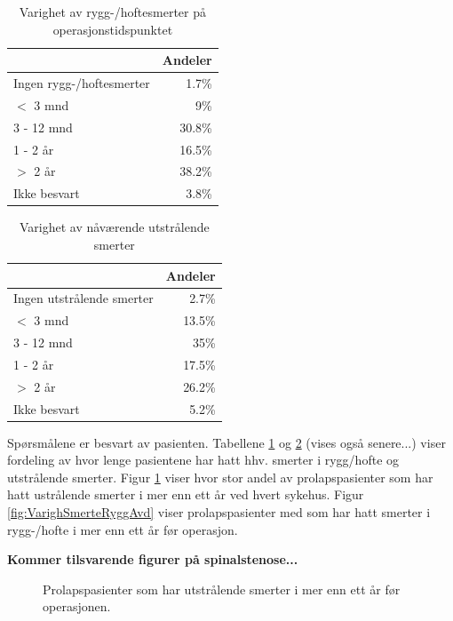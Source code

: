 \documentclass [norsk,a4paper,twoside]{article}\usepackage[]{graphicx}\usepackage[]{color}
\begin{document}
\begin{table}[ht]
\centering
\begin{tabular}{lr}
  \hline
 & Andeler \\ 
  \hline
Ingen rygg-/hoftesmerter & 1.7\% \\ 
  $<$ 3 mnd & 9\% \\ 
  3 - 12 mnd & 30.8\% \\ 
  1 - 2 år & 16.5\% \\ 
  $>$ 2 år & 38.2\% \\ 
  Ikke besvart & 3.8\% \\ 
   \hline
\end{tabular}
\caption{Varighet av rygg-/hoftesmerter på operasjonstidspunktet} 
\label{tab:SmRH}
\end{table}
\begin{table}[ht]
\centering
\begin{tabular}{lr}
  \hline
 & Andeler \\ 
  \hline
Ingen utstrålende smerter & 2.7\% \\ 
  $<$ 3 mnd & 13.5\% \\ 
  3 - 12 mnd & 35\% \\ 
  1 - 2 år & 17.5\% \\ 
  $>$ 2 år & 26.2\% \\ 
  Ikke besvart & 5.2\% \\ 
   \hline
\end{tabular}
\caption{Varighet av nåværende utstrålende smerter} 
\label{tab:Utstr}
\end{table}

Spørsmålene er besvart av pasienten.
Tabellene \ref{tab:SmRH}  og \ref{tab:Utstr} (vises også senere...) viser fordeling av hvor lenge pasientene har hatt 
hhv. smerter i rygg/hofte og utstrålende smerter. Figur \ref{fig:VarighSmerteUtstrAvd} viser hvor stor andel av prolapspasienter som har hatt ustrålende smerter i mer enn ett år ved hvert sykehus. Figur \ref{fig:VarighSmerteRyggAvd} viser prolapspasienter med som har hatt smerter i rygg-/hofte i mer enn ett år før operasjon.

\textbf{Kommer tilsvarende figurer på spinalstenose...}



\begin{figure}[h] 
  \caption{Prolapspasienter som har utstrålende smerter
			i mer enn ett år før operasjonen.}
  \label{fig:VarighSmerteUtstrAvd}
\end{figure}
\end{document}
